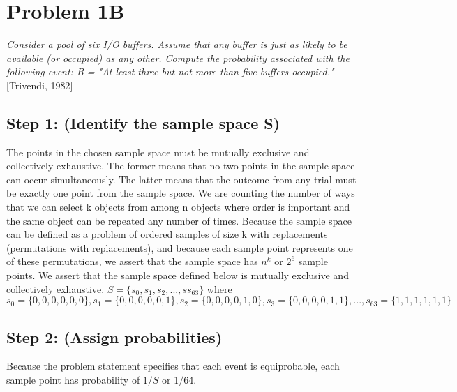 \documentclass[a4paper,10pt]{article}
\title{}
\author{Mark Johnson \\
Loyola University Chicago}
\date {mjohnson4@luc.edu}
\begin{document}
\maketitle

\section{Problem 1B}
\emph{Consider a pool of six I/O buffers. Assume that any buffer is just as likely to be available (or occupied) as 
any other. Compute the probability associated with the following event: \newline
B = "At least three but not more than five buffers occupied."} [Trivendi, 1982]

\subsection{Step 1: (Identify the sample space S)}
The points in the chosen sample space must be mutually exclusive and collectively exhaustive. The former means that 
no two points in the sample space can occur simultaneously. The latter means that the outcome from any trial must be 
exactly one point from the sample space. We are counting the number of ways that we can select k objects from among n 
objects where order is important and the same object can be repeated any number of times. Because the sample space 
can be defined as a problem of ordered samples of size k with replacements (permutations with replacements), and 
because each sample point represents one of these permutations, we assert that the sample space has $ n^{k} $ or $ 2 
^{6} $ sample points. We assert that the sample space defined below is mutually exclusive and collectively 
exhaustive. \newline
$ S = \{s_{0}, s_{1}, s_{2},...,ss_{63}\} $ where \newline
$ s_{0} = \{0,0,0,0,0,0\}, s_{1} = \{0,0,0,0,0,1\}, s_{2} = \{0,0,0,0,1,0\}, s_{3} = \{0,0,0,0,1,1\},...,s_{63} = 
\{1,1,1,1,1,1\} $

\subsection{Step 2: (Assign probabilities)}
Because the problem statement specifies that each event is equiprobable, each sample point has probability of $ 1/S $ 
or 1/64.
\end{document}
